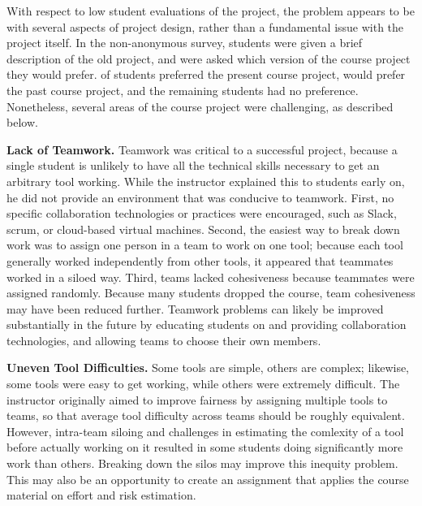 \documentclass[10pt,conference]{IEEEtran}
\begin{document}
With respect to low student evaluations of the project,
the problem appears to be with several aspects of project
design, rather than a fundamental issue with the project itself.
In the non-anonymous survey, students were given a brief description
of the old project, and were asked which version of the course project
they would prefer.
\projectLikeThis of students preferred the present course project,
\projectLikeOther would prefer the past course project,
and the remaining students had no preference.
Nonetheless, several areas of the course project were challenging,
as described below.

\textbf{Lack of Teamwork.}
  	Teamwork was critical to a successful project, because a single student
  	is unlikely to have all the technical skills necessary to get an
  	arbitrary tool working.
  	While the instructor explained this to students early on, 
  	he did not provide an environment that was conducive to teamwork.
  	First, no specific collaboration technologies or practices were encouraged,
  	such as Slack, scrum, or cloud-based virtual machines.
  	Second, the easiest way to break down work was to assign one person in a team
  	to work on one tool; because each tool generally worked independently
  	from other tools, it appeared that teammates worked in a siloed way.  	
  	Third, teams lacked cohesiveness because teammates were assigned randomly.
  	Because many students dropped the course, team cohesiveness may have 
	been reduced further.
	Teamwork problems can likely be improved substantially in the future by 
	educating students on and providing collaboration technologies, and allowing
	teams to choose their own members. 

\textbf{Uneven Tool Difficulties.}
  	Some tools are simple, others are complex; likewise,
  	some tools were easy to get working, while others were extremely difficult.
  	The instructor originally aimed to improve fairness by assigning multiple tools
  	to teams, so that average tool difficulty across teams should be roughly equivalent.
  	However, intra-team siloing and challenges in estimating the 
  	comlexity of a tool before actually working on it resulted in some students doing
  	significantly more work than others.
  	Breaking down the silos may improve this inequity problem.
  	This may also be an opportunity to create an assignment that applies the course
  	material on effort and risk estimation.   	
\end{document}

